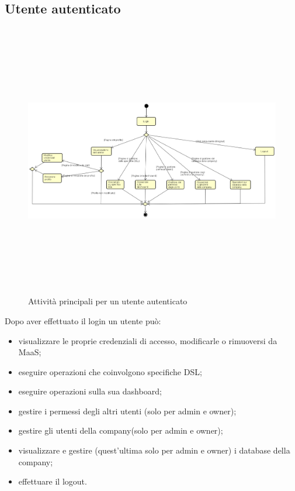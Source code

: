 \subsection{Utente autenticato}
\begin{figure}[H]
\begin{center}
\includegraphics[height=12cm]{res/sections/backend/activities/principaliConAuth.png}
\caption{Attività principali per un utente autenticato}
\end{center}
\end{figure}
Dopo aver effettuato il login un utente può:
\begin{itemize}
\item visualizzare le proprie credenziali di accesso, modificarle o rimuoversi da MaaS;
\item eseguire operazioni che coinvolgono specifiche DSL;
\item eseguire operazioni sulla sua dashboard;
\item gestire i permessi degli altri utenti (solo per admin e owner);
\item gestire gli utenti della company(solo per admin e owner);
\item visualizzare e gestire (quest'ultima solo per admin e owner) i database della company;
\item effettuare il logout.
\end{itemize}
